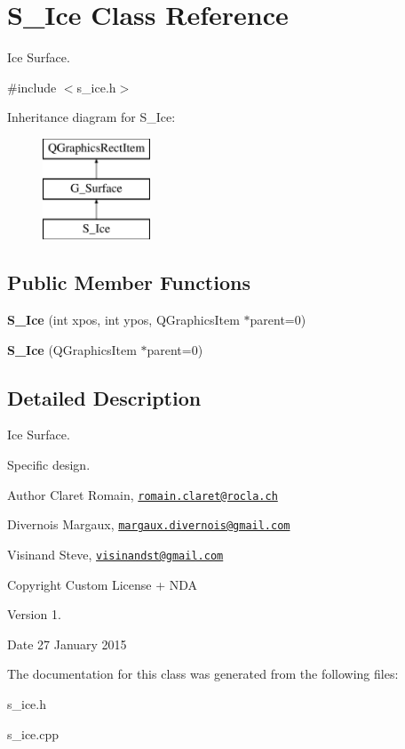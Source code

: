 \hypertarget{class_s___ice}{}\section{S\+\_\+\+Ice Class Reference}
\label{class_s___ice}


Ice Surface.  




{\ttfamily \#include $<$s\+\_\+ice.\+h$>$}

Inheritance diagram for S\+\_\+\+Ice\+:\begin{figure}[H]
\begin{center}
\leavevmode
\includegraphics[height=3.000000cm]{class_s___ice}
\end{center}
\end{figure}
\subsection*{Public Member Functions}
\begin{DoxyCompactItemize}
\item 
\hypertarget{class_s___ice_a3a1fdb0204964dfee672629d22cd0e76}{}{\bfseries S\+\_\+\+Ice} (int xpos, int ypos, Q\+Graphics\+Item $\ast$parent=0)\label{class_s___ice_a3a1fdb0204964dfee672629d22cd0e76}

\item 
\hypertarget{class_s___ice_a17b24abf85ec0bd466971675b657f856}{}{\bfseries S\+\_\+\+Ice} (Q\+Graphics\+Item $\ast$parent=0)\label{class_s___ice_a17b24abf85ec0bd466971675b657f856}

\end{DoxyCompactItemize}


\subsection{Detailed Description}
Ice Surface. 

Specific design. \begin{DoxyAuthor}{Author}
Claret Romain, \href{mailto:romain.claret@rocla.ch}{\tt romain.\+claret@rocla.\+ch} 

Divernois Margaux, \href{mailto:margaux.divernois@gmail.com}{\tt margaux.\+divernois@gmail.\+com} 

Visinand Steve, \href{mailto:visinandst@gmail.com}{\tt visinandst@gmail.\+com} 
\end{DoxyAuthor}
\begin{DoxyCopyright}{Copyright}
Custom License + N\+D\+A 
\end{DoxyCopyright}
\begin{DoxyVersion}{Version}
1. 
\end{DoxyVersion}
\begin{DoxyDate}{Date}
27 January 2015 
\end{DoxyDate}


The documentation for this class was generated from the following files\+:\begin{DoxyCompactItemize}
\item 
s\+\_\+ice.\+h\item 
s\+\_\+ice.\+cpp\end{DoxyCompactItemize}
